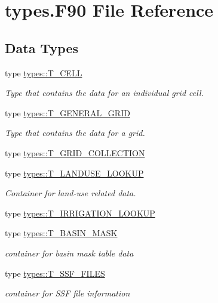 \hypertarget{types_8_f90}{
\section{types.F90 File Reference}
\label{types_8_f90}
}
\subsection*{Data Types}
\begin{DoxyCompactItemize}
\item 
type \hyperlink{typetypes_1_1_t___c_e_l_l}{types::T\_\-CELL}
\begin{DoxyCompactList}\small\item\em Type that contains the data for an individual grid cell. \item\end{DoxyCompactList}\item 
type \hyperlink{typetypes_1_1_t___g_e_n_e_r_a_l___g_r_i_d}{types::T\_\-GENERAL\_\-GRID}
\begin{DoxyCompactList}\small\item\em Type that contains the data for a grid. \item\end{DoxyCompactList}\item 
type \hyperlink{typetypes_1_1_t___g_r_i_d___c_o_l_l_e_c_t_i_o_n}{types::T\_\-GRID\_\-COLLECTION}
\item 
type \hyperlink{typetypes_1_1_t___l_a_n_d_u_s_e___l_o_o_k_u_p}{types::T\_\-LANDUSE\_\-LOOKUP}
\begin{DoxyCompactList}\small\item\em Container for land-\/use related data. \item\end{DoxyCompactList}\item 
type \hyperlink{typetypes_1_1_t___i_r_r_i_g_a_t_i_o_n___l_o_o_k_u_p}{types::T\_\-IRRIGATION\_\-LOOKUP}
\item 
type \hyperlink{typetypes_1_1_t___b_a_s_i_n___m_a_s_k}{types::T\_\-BASIN\_\-MASK}
\begin{DoxyCompactList}\small\item\em container for basin mask table data \item\end{DoxyCompactList}\item 
type \hyperlink{typetypes_1_1_t___s_s_f___f_i_l_e_s}{types::T\_\-SSF\_\-FILES}
\begin{DoxyCompactList}\small\item\em container for SSF file information \item\end{DoxyCompactList}\item 

\end{DoxyCompactItemize}
